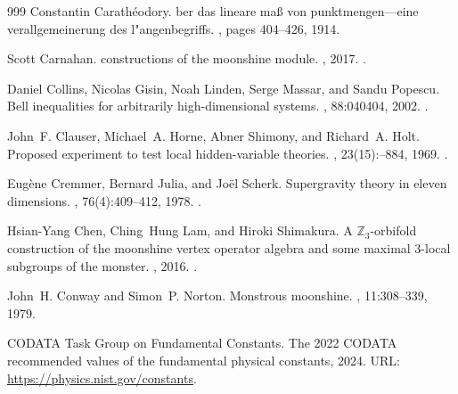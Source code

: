 \begin{thebibliography}{999}
Constantin Carath{\'e}odory.
ber das lineare ma{\ss} von punktmengen---eine verallgemeinerung
  des l{"a}ngenbegriffs.
, pages 404--426, 1914.

Scott Carnahan.
 constructions of the moonshine module.
, 2017.
\newblock \href {https://arxiv.org/abs/1707.02954} {}.

Daniel Collins, Nicolas Gisin, Noah Linden, Serge Massar, and Sandu Popescu.
\newblock Bell inequalities for arbitrarily high-dimensional systems.
, 88:040404, 2002.
\newblock \href {https://doi.org/10.1103/PhysRevLett.88.040404}
  {}.

John~F. Clauser, Michael~A. Horne, Abner Shimony, and Richard~A. Holt.
\newblock Proposed experiment to test local hidden-variable theories.
, 23(15):--884, 1969.
\newblock \href {https://doi.org/10.1103/PhysRevLett.23.880}
  {}.

Eug\`ene Cremmer, Bernard Julia, and Jo\"el Scherk.
\newblock Supergravity theory in eleven dimensions.
, 76(4):409--412, 1978.
\newblock \href {https://doi.org/10.1016/0370-2693(78)90894-8}
  {}.

Hsian-Yang Chen, Ching~Hung Lam, and Hiroki Shimakura.
\newblock A {$\mathbb Z_3$}-orbifold construction of the moonshine vertex
  operator algebra and some maximal 3-local subgroups of the monster.
, 2016.
\newblock \href {https://arxiv.org/abs/1606.05961} {}.

John~H. Conway and Simon~P. Norton.
\newblock Monstrous moonshine.
, 11:308--339, 1979.

{CODATA Task Group on Fundamental Constants}.
\newblock The 2022 {CODATA} recommended values of the fundamental physical
  constants, 2024.
\newblock URL: \url{https://physics.nist.gov/constants}.


\end{thebibliography}
